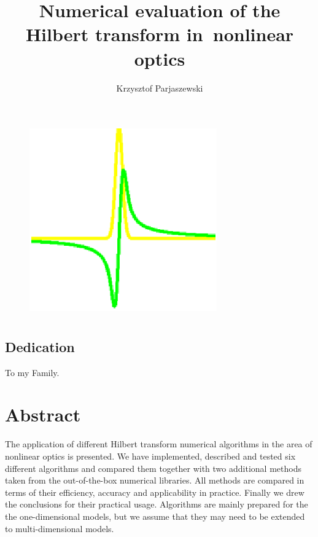 \documentclass[12pt,twoside,a4paper]{article}
\title{Numerical evaluation of the Hilbert transform in~nonlinear optics}
\author{Krzysztof Parjaszewski}
\date{}
\numberwithin{equation}{subsection}
\numberwithin{figure}{subsection}
\begin{document}

\maketitle


\begin{figure}[h]
  \begin{center}
    \includegraphics{img/title.png}
  \end{center}
\end{figure}


\section*{} \label{chap:preamble} 
\subsection*{Dedication} \label{chap:pre_dedication}


To my Family.


\section*{Abstract} \label{chap:abstract}

The application of different Hilbert transform numerical algorithms in the area of nonlinear optics is presented. We have implemented, described and tested six different algorithms and compared them together with two additional methods taken from the out-of-the-box numerical libraries. All methods are compared in terms of their efficiency, accuracy and applicability in practice. Finally we drew the conclusions for their practical usage. Algorithms are mainly prepared for the the one-dimensional models, but we assume that they may need to be extended to multi-dimensional models.
\end{document}
